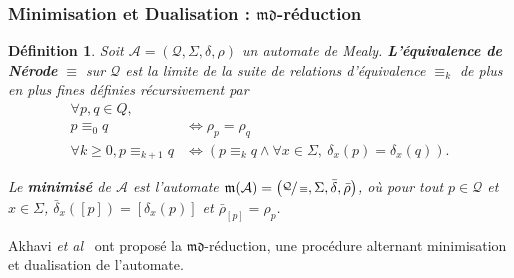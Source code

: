 \documentclass[11pt]{beamer}
\newtheorem{defi}{Définition}
\begin{document}
\begin{frame}
  \frametitle{Minimisation et Dualisation : $\mathfrak{md}$-réduction}

    \begin{defi}
        Soit $\mathcal{A}=\left(\mathcal{Q}, \Sigma, \delta, \rho\right)$ un automate de Mealy. \textbf{L'équivalence de Nérode} $\equiv$ sur $\mathcal{Q}$ est la limite de la suite de relations d'équivalence $\equiv_k$ de plus en plus fines définies récursivement par
        \begin{align*}
        \forall p, q \in Q,\\
        p \equiv_0 q &\iff \rho_p = \rho_q \\
        \forall k \geq 0, p \equiv_{k+1}q &\iff \left(p\equiv_kq \wedge \forall x \in \Sigma,~\delta_x(p)=\delta_x(q)\right).
        \end{align*}

        Le \textbf{minimisé} de $\mathcal{A}$ est l'automate $\mathfrak{m}(\mathcal{A})=\left(\sfrac{\mathcal{Q}}{\equiv}, \Sigma, \bar{\delta}, \bar{\rho}\right)$, où pour tout $p\in\mathcal{Q}$ et $x\in\Sigma$, $\bar{\delta}_x([p]) = [\delta_x(p)]$ et $\bar{\rho}_{[p]} =  \rho_p$.
    \end{defi}

    Akhavi \emph{et al}~\cite{DBLP:journals/corr/abs-1105-4725} ont proposé la $\mathfrak{md}$-réduction, une procédure alternant minimisation et dualisation de l'automate.
\end{frame}
\end{document}
